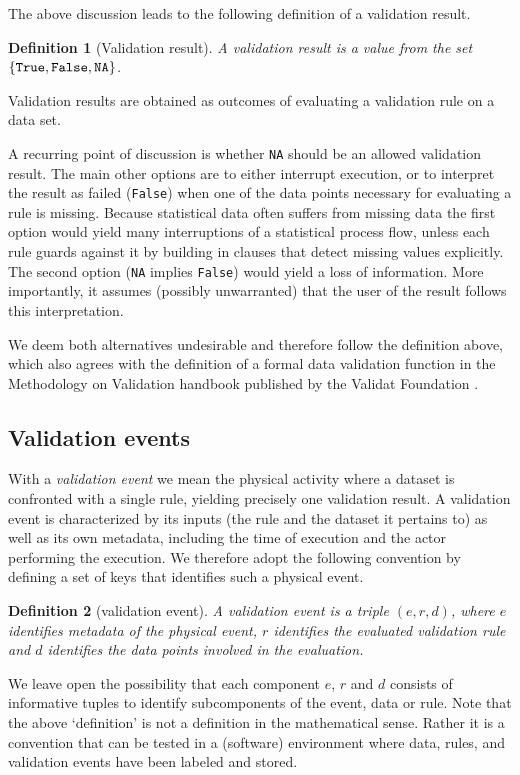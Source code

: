 \documentclass[a4paper, 11pt]{article}
\newtheorem{definition}{Definition}
\newcommand{\waar}{{\normalfont \texttt{True}}}
\newcommand{\onwaar}{{\normalfont \texttt{False}}}
\newcommand{\na}{{\normalfont \texttt{NA}}}
\begin{document}
The above discussion leads to the following definition of a validation result.
%
\begin{definition}[Validation result]
A validation result is a value from the set $\{\waar{},\onwaar{},\na{}\}$.
\label{def:validationresult}
\end{definition}
Validation results are obtained as outcomes of evaluating a validation rule on
a data set.

A recurring point of discussion is whether \na{} should be an allowed
validation result. The main other options are to either interrupt execution, or
to interpret the result as failed (\onwaar{}) when one of the data points
necessary for evaluating a rule is missing. Because statistical data often
suffers from missing data the first option would yield many interruptions of a
statistical process flow, unless each rule guards against it by building in
clauses that detect missing values explicitly. The second option (\na{} implies
\onwaar{}) would yield a loss of information. More importantly, it assumes
(possibly unwarranted) that the user of the result follows this interpretation.

We deem both alternatives undesirable and therefore follow the definition
above, which also agrees with the definition of a formal data validation
function in the Methodology on Validation handbook published by the Validat
Foundation \cite{zio2015methodology}.

\subsection{Validation events}

With a \emph{validation event} we mean the physical activity where a dataset is
confronted with a single rule, yielding precisely one validation result. A
validation event is characterized by its inputs (the rule and the dataset it
pertains to) as well as its own metadata, including the time of execution and
the actor performing the execution. We therefore adopt the following convention
by defining a set of keys that identifies such a physical event.
%
\begin{definition}[validation event] 
A validation event is a triple $(e,r,d)$, where $e$ identifies metadata of the
physical event, $r$ identifies the evaluated validation rule and $d$ identifies
the data points involved in the evaluation.
\label{def:validaitonevent}
\end{definition}
%
We leave open the possibility that each component $e$, $r$ and $d$ consists of
informative tuples to identify subcomponents of the event, data or rule.  Note
that the above `definition' is not a definition in the mathematical sense.
Rather it is a convention that can be tested in a (software) environment where
data, rules, and validation events have been labeled and stored.
\end{document}
